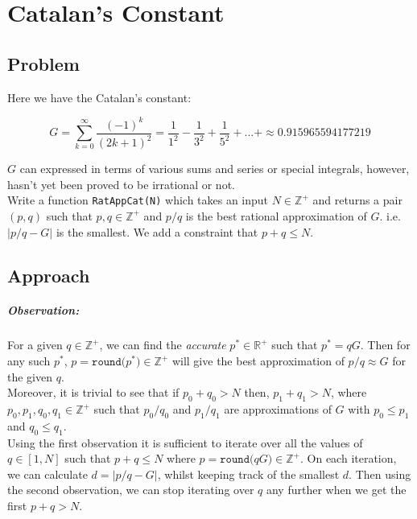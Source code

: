 \documentclass[11pt]{report}
\begin{document}
\chapter{Catalan's Constant}
\section*{Problem}
Here we have the Catalan's constant:

\begin{equation*}
	G = \sum_{k=0}^{\infty} \frac{(-1)^k}{(2k +1)^2} = \frac{1}{1^2} - \frac{1}{3^2} + \frac{1}{5^2} + ... + \approx 0.915965594177219
\end{equation*}

$G$ can expressed in terms of various sums and series or special integrals, however, hasn't yet been proved to be irrational or not. \\

Write a function \texttt{RatAppCat(N)} which takes an input $N\in\mathbb{Z^+}$ and returns a pair $(p, q)$ such that $p,q\in\mathbb{Z^+}$ and $p/q$ is the best rational approximation of $G$. i.e. $|p/q-G|$ is the smallest. We add a constraint that $p+q\leqslant N$.

\section{Approach}

\paragraph{Observation:}
For a given $q\in\mathbb{Z^+}$, we can find the \textit{accurate} $p^*\in\mathbb{R^+}$ such that $p^*=qG$. Then for any such $p^*$, $p=\texttt{round(}p^*\texttt{)} \in \mathbb{Z^+}$ will give the best approximation of $p/q \approx G$ for the given $q$. \\

Moreover, it is trivial to see that  if $p_0 + q_0 > N$ then, $p_1 + q_1 > N$, where $p_0, p_1, q_0, q_1 \in \mathbb{Z^+}$ such that $p_0/q_0$ and $p_1/q_1$ are approximations of $G$ with $p_0 \leq p_1$ and $q_0 \leq q_1$. \\

Using the first observation it is sufficient to iterate over all the values of $q\in[1,N]$ such that $p+q\leq N$ where $p = \texttt{round(}qG\texttt{)} \in \mathbb{Z^+}$. On each iteration, we can calculate $d = |p/q - G|$, whilst keeping track of the smallest $d$. Then using the second observation, we can stop iterating over $q$ any further when we get the first $p+q>N$. \\
\end{document}
